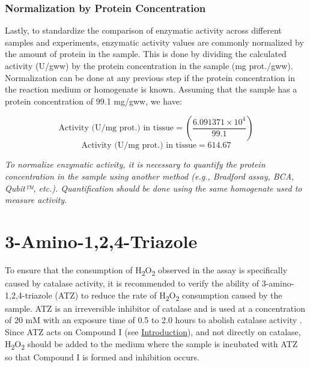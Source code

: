 \documentclass[
  9pt,
  american,
  a5paper,
  extrafontsizes,onecolumn,openright
  ]{memoir}
\begin{document}
\subsubsection{Normalization by Protein Concentration}\label{normalization-by-protein-concentration}

Lastly, to standardize the comparison of enzymatic activity across different samples and experiments, enzymatic activity values are commonly normalized by the amount of protein in the sample. This is done by dividing the calculated activity (U/gww) by the protein concentration in the sample (mg prot./gww). Normalization can be done at any previous step if the protein concentration in the reaction medium or homogenate is known. Assuming that the sample has a protein concentration of 99.1 mg/gww, we have:

\[ \text{Activity (U/mg prot.) in tissue} = \left( \frac{\ensuremath{6.091371\times 10^{4}}}{99.1} \right)\]
\[ \text{Activity (U/mg prot.) in tissue} = 614.67 \]

\begin{greybox}[frametitle = Note]
\emph{To normalize enzymatic activity, it is necessary to quantify the protein concentration in the sample using another method (e.g., Bradford assay, BCA, Qubit™, etc.). Quantification should be done using the same homogenate used to measure activity.}

\end{greybox}

\section{3-Amino-1,2,4-Triazole}\label{amino-124-triazole}

To ensure that the consumption of H\textsubscript{2}O\textsubscript{2} observed in the assay is specifically caused by catalase activity, it is recommended to verify the ability of 3-amino-1,2,4-triazole (ATZ) to reduce the rate of H\textsubscript{2}O\textsubscript{2} consumption caused by the sample. ATZ is an irreversible inhibitor of catalase and is used at a concentration of 20 mM with an exposure time of 0.5 to 2.0 hours to abolish catalase activity \autocite{margoliash_study_1958,margoliash_irreversible_1960,watanabe_autoxidation_2003}. Since ATZ acts on Compound I (see \hyperref[intro]{Introduction}), and not directly on catalase, H\textsubscript{2}O\textsubscript{2} should be added to the medium where the sample is incubated with ATZ so that Compound I is formed and inhibition occurs.
\end{document}
